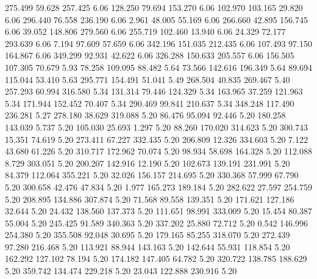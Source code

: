  275.499   59.628  257.425         6.06
 128.250   79.694  153.270         6.06
 102.970  103.165   29.820         6.06
 296.440   76.558  236.190         6.06
   2.961   48.005   55.169         6.06
 266.660   42.895  156.745         6.06
  39.052  148.806  279.560         6.06
 255.719  102.460   13.940         6.06
  24.329   72.177  293.639         6.06
   7.194   97.609   57.659         6.06
 342.196  151.035  212.435         6.06
 107.493   97.150  164.867         6.06
 349.299   92.931   42.622         6.06
 326.288  150.633  205.557         6.06
 156.505  107.305   70.679         5.93
  78.258  109.095   88.482         5.64
  73.566  142.616  196.349         5.64
  89.694  115.044   53.410         5.63
 295.771  154.491   51.041         5.49
 268.504   40.835  269.467         5.40
 257.293   60.994  316.580         5.34
 131.314   79.446  124.329         5.34
 163.965   37.259  121.963         5.34
 171.944  152.452   70.407         5.34
 290.469   99.841  210.637         5.34
 348.248  117.490  236.281         5.27
 278.180   38.629  319.088         5.20
  86.476   95.094   92.446         5.20
 180.258  143.039    5.737         5.20
 105.030   25.693    1.297         5.20
  88.260  170.020  314.623         5.20
 300.743   15.351   74.619         5.20
 273.411   67.227  332.435         5.20
 206.809   12.326  334.603         5.20
   7.122   43.680   61.226         5.20
 310.717  172.962   70.074         5.20
  98.934   58.698  164.328         5.20
 112.088    8.729  303.051         5.20
 200.207  142.916   12.190         5.20
 102.673  139.191  231.991         5.20
  84.379  112.064  355.221         5.20
  32.026  156.157  214.695         5.20
 330.368   57.999   67.790         5.20
 300.658   42.476   47.834         5.20
   1.977  165.273  189.184         5.20
 282.622   27.597  254.759         5.20
 208.895  134.886  307.874         5.20
  71.568   89.558  139.351         5.20
 171.621  127.186   32.644         5.20
  24.432  138.560  137.373         5.20
 111.651   98.991  333.009         5.20
  15.454   80.387   55.004         5.20
 245.425   91.589  340.363         5.20
 337.202   25.880   72.712         5.20
   0.542  146.996  254.380         5.20
 355.508   92.048   30.695         5.20
 179.165   85.255  318.070         5.20
 272.439   97.280  216.468         5.20
 113.921   88.944  143.163         5.20
 142.644   55.931  118.854         5.20
 162.292  127.102   78.194         5.20
 174.182  147.405   64.782         5.20
 320.722  138.785  188.629         5.20
 359.742  134.474  229.218         5.20
  23.043  122.888  230.916         5.20
